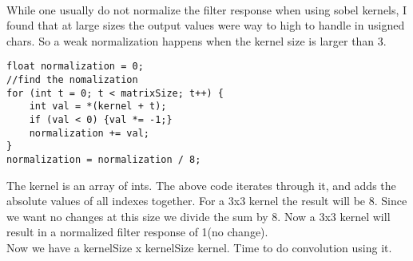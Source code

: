 \documentclass{article}
\begin{document}
\\
While one usually do not normalize the filter response when using sobel kernels, I found that at large sizes the output values were way to high to handle in usigned chars. So a weak normalization happens when the kernel size is larger than 3.
\begin{lstlisting}
float normalization = 0;
//find the nomalization
for (int t = 0; t < matrixSize; t++) {
	int val = *(kernel + t);
	if (val < 0) {val *= -1;}
	normalization += val;
}
normalization = normalization / 8;
\end{lstlisting}
The kernel is an array of ints. The above code iterates through it, and adds the absolute values of all indexes together. For a 3x3 kernel the result will be 8. Since we want no changes at this size we divide the sum by 8. Now a 3x3 kernel will result in a normalized filter response of 1(no change).\\
Now we have a kernelSize x kernelSize kernel. Time to do convolution using it.
\end{document}
